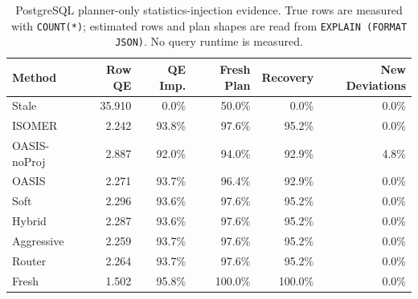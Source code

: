 \begin{table}[t]
  \centering
  \small
  \caption{PostgreSQL planner-only statistics-injection evidence. True rows are measured with \texttt{COUNT(*)}; estimated rows and plan shapes are read from \texttt{EXPLAIN (FORMAT JSON)}. No query runtime is measured.}
  \label{tab:postgres_planner_stats_injection}
  \setlength{\tabcolsep}{4pt}
  \begin{tabular}{lrrrrr}
    \toprule
    Method & Row QE & QE Imp. & Fresh Plan & Recovery & New Deviations \\
    \midrule
    Stale & 35.910 & 0.0\% & 50.0\% & 0.0\% & 0.0\% \\
    ISOMER & 2.242 & 93.8\% & 97.6\% & 95.2\% & 0.0\% \\
    OASIS-noProj & 2.887 & 92.0\% & 94.0\% & 92.9\% & 4.8\% \\
    OASIS & 2.271 & 93.7\% & 96.4\% & 92.9\% & 0.0\% \\
    Soft & 2.296 & 93.6\% & 97.6\% & 95.2\% & 0.0\% \\
    Hybrid & 2.287 & 93.6\% & 97.6\% & 95.2\% & 0.0\% \\
    Aggressive & 2.259 & 93.7\% & 97.6\% & 95.2\% & 0.0\% \\
    Router & 2.264 & 93.7\% & 97.6\% & 95.2\% & 0.0\% \\
    Fresh & 1.502 & 95.8\% & 100.0\% & 100.0\% & 0.0\% \\
    \bottomrule
  \end{tabular}
\end{table}

